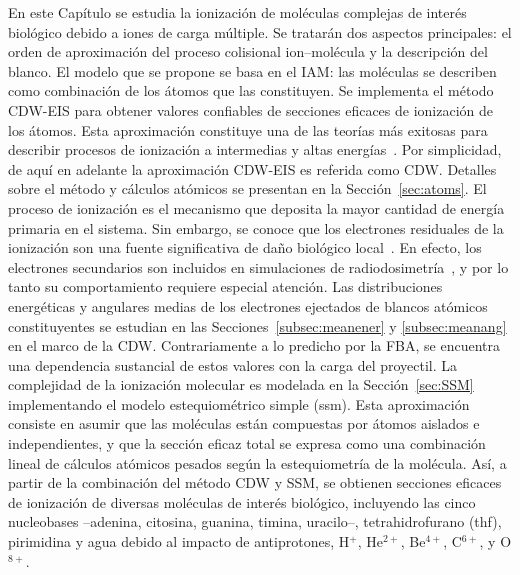 En este Capítulo se estudia la ionización de moléculas complejas de 
interés biológico debido a iones de carga múltiple. Se tratarán dos 
aspectos principales: el orden de aproximación del proceso colisional 
ion--molécula y la descripción del blanco. El modelo que se propone se 
basa en el IAM: las moléculas se describen como combinación de los 
átomos que las constituyen. Se implementa el método CDW-EIS para obtener 
valores confiables de secciones eficaces de ionización de los átomos. 
Esta aproximación constituye una de las teorías más exitosas para 
describir procesos de ionización a intermedias y altas 
energías~\cite{Miraglia:08,Miraglia:09,Montanari:17-iongasesnobles}. 
Por simplicidad, de aquí en 
adelante la aproximación CDW-EIS es referida como CDW. Detalles sobre el 
método y cálculos atómicos se presentan en la Sección~\ref{sec:atoms}. 
El proceso de ionización es el mecanismo que deposita la mayor cantidad 
de energía primaria en el sistema. Sin embargo, se conoce que los 
electrones residuales de la ionización son una fuente significativa de 
daño biológico local~\cite{Denifl:11}. En efecto, los electrones 
secundarios son incluidos en simulaciones de 
radiodosimetría~\cite{Champion:15,Quinto:17,Acocer-Avila:19}, y por lo 
tanto su comportamiento requiere especial atención. Las distribuciones 
energéticas y angulares medias de los electrones ejectados de blancos 
atómicos constituyentes se estudian en las 
Secciones~\ref{subsec:meanener} y \ref{subsec:meanang} en el 
marco de la CDW. Contrariamente a lo predicho por la FBA, se encuentra 
una dependencia sustancial de estos valores con la carga del proyectil. 
La complejidad de la ionización molecular es modelada en la  
Sección~\ref{sec:SSM} implementando el modelo estequiométrico simple 
(\acs{ssm}). Esta aproximación consiste en asumir que las moléculas están 
compuestas por átomos aislados e independientes, y que la sección eficaz 
total se expresa como una combinación lineal de cálculos atómicos 
pesados según la estequiometría de la molécula. Así, a partir de la 
combinación del método CDW y SSM, se obtienen secciones eficaces de 
ionización de diversas moléculas de interés biológico, incluyendo las 
cinco nucleobases --adenina, citosina, guanina, timina, uracilo--, 
tetrahidrofurano (\acs{thf}), pirimidina y agua debido al impacto de 
antiprotones, H$^{+}$, He$^{2+}$, Be$^{4+}$, C$^{6+}$, y O$^{8+}$. 

